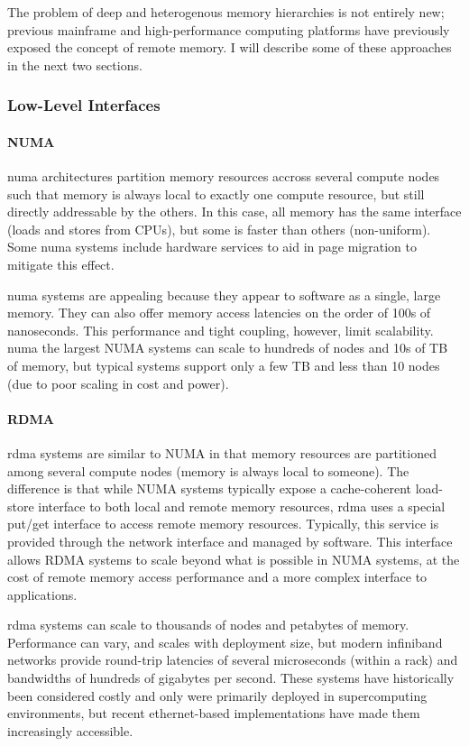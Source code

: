 The problem of deep and heterogenous memory hierarchies is not entirely new;
previous mainframe and high-performance computing platforms have previously
exposed the concept of remote memory. I will describe some of these approaches
in the next two sections.

\subsubsection{Low-Level Interfaces}
\paragraph{NUMA}
\Gls{numa} architectures partition memory resources accross several compute
nodes such that memory is always local to exactly one compute resource, but
still directly addressable by the others. In this case, all memory has the same
interface (loads and stores from CPUs), but some is faster than others
(non-uniform). Some \gls{numa} systems include hardware services to aid in page
migration to mitigate this effect\cite{sgi_origin}.

\Gls{numa} systems are appealing because they appear to software as a single,
large memory. They can also offer memory access latencies on the order of 100s
of nanoseconds. This performance and tight coupling, however, limit
scalability. \Gls{numa} the largest NUMA systems can scale to hundreds of nodes
and 10s of TB of memory\cite{sgiUV}, but typical systems support only a few TB
and less than 10 nodes (due to poor scaling in cost and power).

\paragraph{RDMA}
\gls{rdma} systems are similar to NUMA in that memory resources are partitioned
among several compute nodes (memory is always local to
someone)\cite{RoCE}\cite{RFC5040}. The difference is that while NUMA systems
typically expose a cache-coherent load-store interface to both local and remote
memory resources, \gls{rdma} uses a special put/get interface to access remote
memory resources.  Typically, this service is provided through the network
interface and managed by software. This interface allows RDMA systems to scale
beyond what is possible in NUMA systems, at the cost of remote memory access
performance and a more complex interface to applications.

\Gls{rdma} systems can scale to thousands of nodes and petabytes of
memory\cite{IB_ref_design}. Performance can vary, and scales with deployment
size, but modern infiniband networks provide round-trip latencies of several
microseconds (within a rack) and bandwidths of hundreds of gigabytes per
second\cite{ib_perf}. These systems have historically been considered costly
and only were primarily deployed in supercomputing environments, but recent
ethernet-based implementations have made them increasingly
accessible\cite{RoCE}.
 
